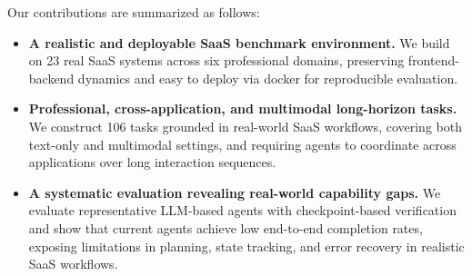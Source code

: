 Our contributions are summarized as follows:

\begin{itemize}[leftmargin=1.5em]
    \item \textbf{A realistic and deployable SaaS benchmark environment.}
    We build \datasetname on 23 real SaaS systems across six professional domains, preserving frontend-backend dynamics and easy to deploy via docker for reproducible evaluation.

    \item \textbf{Professional, cross-application, and multimodal long-horizon tasks.}
    We construct 106 tasks grounded in real-world SaaS workflows, covering both text-only and multimodal settings, and requiring agents to coordinate across applications over long interaction sequences.

    \item \textbf{A systematic evaluation revealing real-world capability gaps.}
    We evaluate representative LLM-based agents with checkpoint-based verification and show that current agents achieve low end-to-end completion rates, exposing limitations in planning, state tracking, and error recovery in realistic SaaS workflows.
\end{itemize}

\begin{table}
\centering
\small
\caption{Comparison of \datasetname with existing web and GUI agent benchmarks. \cmark~indicates full support, \xmark~indicates no support, and \pmark~indicates partial support. \textbf{Long.} denotes tasks requiring over 100 interaction steps on average, and \textbf{MM} denotes multimodal evidence such as images or documents.}
\label{tab:benchmark_compare}
\vspace{0.3em}
\setlength{\tabcolsep}{3pt}
\renewcommand{\arraystretch}{1.08}
\vspace{-0.5em}
\end{table}
